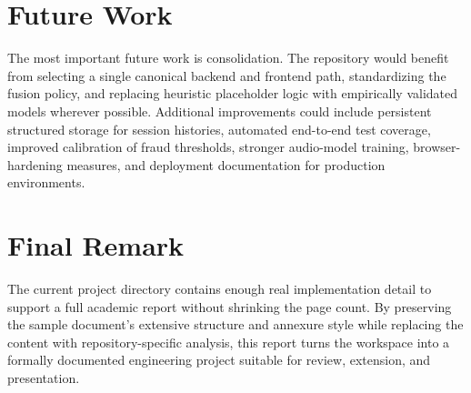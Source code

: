\documentclass[12pt,a4paper]{extreport}
\begin{document}
\section{Future Work}
The most important future work is consolidation. The repository would benefit from selecting a single canonical backend and frontend path, standardizing the fusion policy, and replacing heuristic placeholder logic with empirically validated models wherever possible. Additional improvements could include persistent structured storage for session histories, automated end-to-end test coverage, improved calibration of fraud thresholds, stronger audio-model training, browser-hardening measures, and deployment documentation for production environments.

\section{Final Remark}
The current project directory contains enough real implementation detail to support a full academic report without shrinking the page count. By preserving the sample document's extensive structure and annexure style while replacing the content with repository-specific analysis, this report turns the workspace into a formally documented engineering project suitable for review, extension, and presentation.
\end{document}
